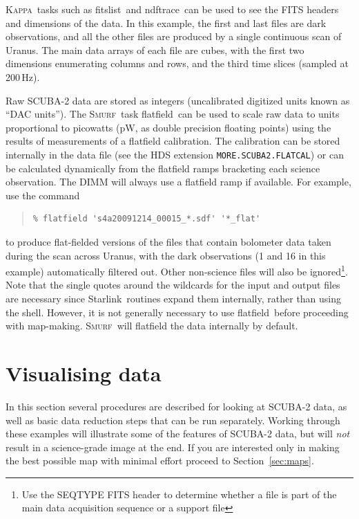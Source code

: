 \documentclass[twoside,11pt]{article}
\newcommand{\htmladdnormallink}[2]{#1}
\newcommand{\xref}[3]{#1}
\newcommand{\xlabel}[1]{}
\renewcommand{\_}{\texttt{\symbol{95}}}
\newenvironment{myquote}{\begin{quote}\begin{small}}{\end{small}\end{quote}}
\newcommand{\starlink}{\htmladdnormallink{Starlink}{http://starlink.jach.hawaii.edu}}
\newcommand{\Kappa}{\xref{\textsc{Kappa}}{sun95}{}}
\newcommand{\smurf}{\xref{\textsc{Smurf}}{sun258}{}}
\newcommand{\task}[1]{\textsf{#1}}
\newcommand{\flatfield}{\xref{\task{flatfield}}{sun258}{FLATFIELD}}
\newcommand{\fitslist}{\xref{\task{fitslist}}{sun95}{FITSLIST}}
\newcommand{\ndftrace}{\xref{\task{ndftrace}}{sun95}{NDFTRACE}}
\begin{document}
\Kappa\ tasks such as \fitslist\ and \ndftrace\ can be used to see the
FITS headers and dimensions of the data. In this example, the first
and last files are dark observations, and all the other files are
produced by a single continuous scan of Uranus. The main data arrays
of each file are cubes, with the first two dimensions enumerating
columns and rows, and the third time slices (sampled at 200\,Hz).

Raw SCUBA-2 data are stored as integers (uncalibrated digitized units
known as ``DAC units''). The \smurf\ task \flatfield\ can be used to
scale raw data to units proportional to picowatts (pW, as double
precision floating points) using the results of measurements of a
flatfield calibration. The calibration can be stored internally in the
data file (see the HDS extension \texttt{MORE.SCUBA2.FLATCAL}) or can
be calculated dynamically from the flatfield ramps bracketing each
science observation. The DIMM will always use a flatfield ramp if
available. For example, use the command

\begin{myquote}
\begin{verbatim}
% flatfield 's4a20091214_00015_*.sdf' '*_flat'
\end{verbatim}
\end{myquote}
%
to produce flat-fielded versions of the files that contain bolometer
data taken during the scan across Uranus, with the dark observations
(1 and 16 in this example) automatically filtered out. Other
non-science files will also be ignored\footnote{Use the SEQ\_TYPE FITS
  header to determine whether a file is part of the main data
  acquisition sequence or a support file}. Note that the single quotes
around the wildcards for the input and output files are necessary
since \starlink\ routines expand them internally, rather than using
the shell. However, it is not generally necessary to use \flatfield\
before proceeding with map-making. \smurf\ will flatfield the data
internally by default.

\section{\xlabel{time_series}Visualising data}
\label{sec:visual}

In this section several procedures are described for looking at
SCUBA-2 data, as well as basic data reduction steps that can be run
separately. Working through these examples will illustrate some of the
features of SCUBA-2 data, but will {\em not} result in a science-grade
image at the end. If you are interested only in making the best
possible map with minimal effort proceed to Section~\ref{sec:maps}.
\end{document}
